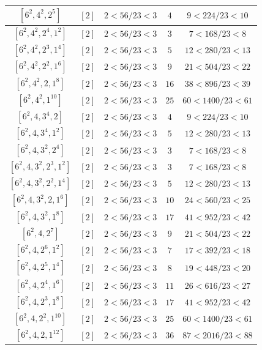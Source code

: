 \documentclass{article}%
\begin{document}
\begin{center}
\begin{longtable}{||c|c|c|c|c||}
$[6^{2}, 4^{2}, 2^{5}]$ & $[2]$ & $2 < 56/23 < 3$ & $4$ & $9 < 224/23 < 10$ \\ \hline 
$[6^{2}, 4^{2}, 2^{4}, 1^{2}]$ & $[2]$ & $2 < 56/23 < 3$ & $3$ & $7 < 168/23 < 8$ \\ \hline 
$[6^{2}, 4^{2}, 2^{3}, 1^{4}]$ & $[2]$ & $2 < 56/23 < 3$ & $5$ & $12 < 280/23 < 13$ \\ \hline 
$[6^{2}, 4^{2}, 2^{2}, 1^{6}]$ & $[2]$ & $2 < 56/23 < 3$ & $9$ & $21 < 504/23 < 22$ \\ \hline 
$[6^{2}, 4^{2}, 2, 1^{8}]$ & $[2]$ & $2 < 56/23 < 3$ & $16$ & $38 < 896/23 < 39$ \\ \hline 
$[6^{2}, 4^{2}, 1^{10}]$ & $[2]$ & $2 < 56/23 < 3$ & $25$ & $60 < 1400/23 < 61$ \\ \hline 
$[6^{2}, 4, 3^{4}, 2]$ & $[2]$ & $2 < 56/23 < 3$ & $4$ & $9 < 224/23 < 10$ \\ \hline 
$[6^{2}, 4, 3^{4}, 1^{2}]$ & $[2]$ & $2 < 56/23 < 3$ & $5$ & $12 < 280/23 < 13$ \\ \hline 
$[6^{2}, 4, 3^{2}, 2^{4}]$ & $[2]$ & $2 < 56/23 < 3$ & $3$ & $7 < 168/23 < 8$ \\ \hline 
$[6^{2}, 4, 3^{2}, 2^{3}, 1^{2}]$ & $[2]$ & $2 < 56/23 < 3$ & $3$ & $7 < 168/23 < 8$ \\ \hline 
$[6^{2}, 4, 3^{2}, 2^{2}, 1^{4}]$ & $[2]$ & $2 < 56/23 < 3$ & $5$ & $12 < 280/23 < 13$ \\ \hline 
$[6^{2}, 4, 3^{2}, 2, 1^{6}]$ & $[2]$ & $2 < 56/23 < 3$ & $10$ & $24 < 560/23 < 25$ \\ \hline 
$[6^{2}, 4, 3^{2}, 1^{8}]$ & $[2]$ & $2 < 56/23 < 3$ & $17$ & $41 < 952/23 < 42$ \\ \hline 
$[6^{2}, 4, 2^{7}]$ & $[2]$ & $2 < 56/23 < 3$ & $9$ & $21 < 504/23 < 22$ \\ \hline 
$[6^{2}, 4, 2^{6}, 1^{2}]$ & $[2]$ & $2 < 56/23 < 3$ & $7$ & $17 < 392/23 < 18$ \\ \hline 
$[6^{2}, 4, 2^{5}, 1^{4}]$ & $[2]$ & $2 < 56/23 < 3$ & $8$ & $19 < 448/23 < 20$ \\ \hline 
$[6^{2}, 4, 2^{4}, 1^{6}]$ & $[2]$ & $2 < 56/23 < 3$ & $11$ & $26 < 616/23 < 27$ \\ \hline 
$[6^{2}, 4, 2^{3}, 1^{8}]$ & $[2]$ & $2 < 56/23 < 3$ & $17$ & $41 < 952/23 < 42$ \\ \hline 
$[6^{2}, 4, 2^{2}, 1^{10}]$ & $[2]$ & $2 < 56/23 < 3$ & $25$ & $60 < 1400/23 < 61$ \\ \hline 
$[6^{2}, 4, 2, 1^{12}]$ & $[2]$ & $2 < 56/23 < 3$ & $36$ & $87 < 2016/23 < 88$ \\ \hline 

\end{longtable}
\end{center}
\end{document}
